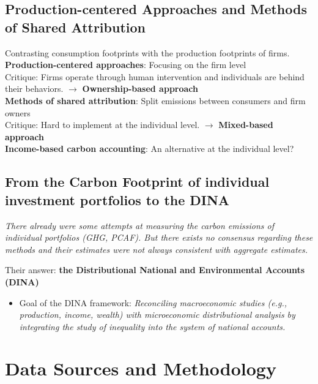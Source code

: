 \documentclass[10pt]{beamer}
\begin{document}
\subsection{Production-centered Approaches and Methods of Shared Attribution}
\begin{frame}{\subsecname}
    Contrasting consumption footprints with the production footprints of firms. \\
    \hfill \break
    \textbf{Production-centered approaches}: Focusing on the firm level \\
    Critique: Firms operate through human intervention and individuals are behind their behaviors. $\rightarrow$ \textbf{Ownership-based approach} \\
    \hfill \break
    \textbf{Methods of shared attribution}: Split emissions between consumers and firm owners \\
    Critique: Hard to implement at the individual level. $\rightarrow$ \textbf{Mixed-based approach} \\
    \hfill \break
    \textbf{Income-based carbon accounting}: An alternative at the individual level?
\end{frame}

\subsection{From the Carbon Footprint of individual investment portfolios to the DINA}
\begin{frame}{\subsecname}
    \textit{There already were some attempts at measuring the carbon emissions of individual portfolios (GHG, PCAF). But there exists no consensus regarding these methods and their estimates were not always consistent with aggregate estimates.}
    \vspace{15pt}
    
    Their answer:
    \textbf{the Distributional National and Environmental Accounts (DINA)}
    \begin{itemize}
        \item Goal of the DINA framework: \textit{Reconciling macroeconomic studies (e.g., production, income, wealth) with microeconomic distributional analysis by integrating the study of inequality into the system of national accounts. }
    \end{itemize}
\end{frame}

\section{Data Sources and Methodology}
\end{document}

